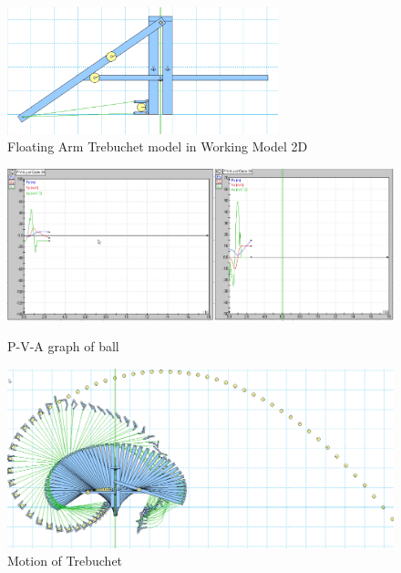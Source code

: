 \documentclass[12pt, titlepage]{article}
\begin{document}
    \begin{figure}[t]                                  
    \centering
    \includegraphics[width=0.7\textwidth]{Model.png}
    \caption{Floating Arm Trebuchet model in Working Model 2D\label{model}}
    \end{figure}

\begin{figure}[b]
    \begin{minipage}[t]{0.69\textwidth}
        \vspace{12pt}
        \begin{flushleft}
            \includegraphics[width=\textwidth]{Graphs.png}
        \end{flushleft}
        \caption{P-V-A graph of ball\label{graphs}}
    \end{minipage}
    \hfill
    \begin{minipage}[t]{0.3\textwidth}
        \vspace{50pt}
        \begin{flushright}
            \includegraphics[width=\textwidth]{Motion.png}
        \end{flushright}
        \caption{Motion of Trebuchet\label{motion}}
    \end{minipage}
    \end{figure}
    \newpage
\end{document}
